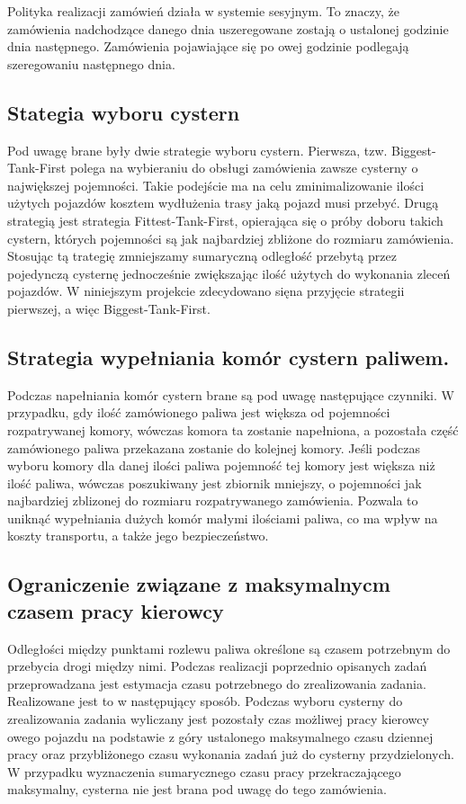 \documentclass[11pt,a4paper,oneside]{mwart}
\begin{document}
Polityka realizacji zamówień działa w systemie sesyjnym. To znaczy, że zamówienia nadchodzące danego dnia uszeregowane zostają o ustalonej godzinie dnia następnego. Zamówienia pojawiające się po owej godzinie podlegają szeregowaniu następnego dnia.

\subsection{Stategia wyboru cystern}

	Pod uwagę brane były dwie strategie wyboru cystern. Pierwsza, tzw. Biggest-Tank-First polega na wybieraniu do obsługi zamówienia zawsze cysterny o największej pojemności. Takie podejście ma na celu zminimalizowanie ilości użytych pojazdów kosztem wydłużenia trasy jaką pojazd musi przebyć. Drugą strategią jest strategia Fittest-Tank-First, opierająca się o próby doboru takich cystern, których pojemności są jak najbardziej zbliżone do rozmiaru zamówienia. Stosując tą trategię zmniejszamy sumaryczną odległość przebytą przez pojedynczą cysternę jednocześnie zwiększając ilość użytych do wykonania zleceń pojazdów. W niniejszym projekcie zdecydowano sięna przyjęcie strategii pierwszej, a więc Biggest-Tank-First.

  \subsection{Strategia wypełniania komór cystern paliwem.}

	Podczas napełniania komór cystern brane są pod uwagę następujące czynniki. W przypadku, gdy ilość zamówionego paliwa jest większa od pojemności rozpatrywanej komory, wówczas komora ta zostanie napełniona, a pozostała część zamówionego paliwa przekazana zostanie do kolejnej komory. Jeśli podczas wyboru komory dla danej ilości paliwa pojemność tej komory jest większa niż ilość paliwa, wówczas poszukiwany jest zbiornik mniejszy, o pojemności jak najbardziej zblizonej do rozmiaru rozpatrywanego zamówienia. Pozwala to uniknąć wypełniania dużych komór małymi ilościami paliwa, co ma wpływ na koszty transportu, a także jego bezpieczeństwo. 

  \subsection{Ograniczenie związane z maksymalnycm czasem pracy kierowcy}
	Odległości między punktami rozlewu paliwa określone są czasem potrzebnym do przebycia drogi między nimi. Podczas realizacji poprzednio opisanych zadań przeprowadzana jest estymacja czasu potrzebnego do zrealizowania zadania. Realizowane jest to w następujący sposób. Podczas wyboru cysterny do zrealizowania zadania wyliczany jest pozostały czas możliwej pracy kierowcy owego pojazdu na podstawie z góry ustalonego maksymalnego czasu dziennej pracy oraz przybliżonego czasu wykonania zadań już do cysterny przydzielonych. W przypadku wyznaczenia sumarycznego czasu pracy przekraczającego maksymalny, cysterna nie jest brana pod uwagę do tego zamówienia.
\end{document}

